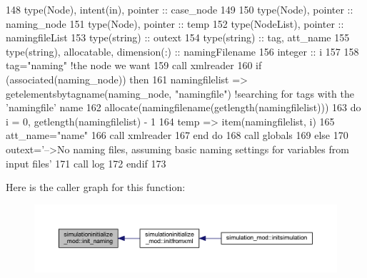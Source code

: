 \begin{DoxyCode}
148     \textcolor{keywordtype}{type}(Node), \textcolor{keywordtype}{intent(in)}, \textcolor{keywordtype}{pointer} :: case\_node
149 
150     \textcolor{keywordtype}{type}(Node), \textcolor{keywordtype}{pointer} :: naming\_node
151     \textcolor{keywordtype}{type}(Node), \textcolor{keywordtype}{pointer} :: temp
152     \textcolor{keywordtype}{type}(NodeList), \textcolor{keywordtype}{pointer} :: namingfileList
153     \textcolor{keywordtype}{type}(string) :: outext
154     \textcolor{keywordtype}{type}(string) :: tag, att\_name
155     \textcolor{keywordtype}{type}(string), \textcolor{keywordtype}{allocatable}, \textcolor{keywordtype}{dimension(:)} :: namingFilename
156     \textcolor{keywordtype}{integer} :: i
157 
158     tag=\textcolor{stringliteral}{"naming"}    \textcolor{comment}{!the node we want}
159     \textcolor{keyword}{call }xmlreader%
160     \textcolor{keywordflow}{if} (\textcolor{keyword}{associated}(naming\_node)) \textcolor{keywordflow}{then}
161         namingfilelist => getelementsbytagname(naming\_node, \textcolor{stringliteral}{"namingfile"})       \textcolor{comment}{!searching for tags with
       the 'namingfile' name}
162         \textcolor{keyword}{allocate}(namingfilename(getlength(namingfilelist)))
163         \textcolor{keywordflow}{do} i = 0, getlength(namingfilelist) - 1
164             temp => item(namingfilelist, i)
165             att\_name=\textcolor{stringliteral}{"name"}
166             \textcolor{keyword}{call }xmlreader%
167 \textcolor{keywordflow}{        end do}
168         \textcolor{keyword}{call }globals%
169     \textcolor{keywordflow}{else}
170         outext=\textcolor{stringliteral}{'-->No naming files, assuming basic naming settings for variables from input files'}
171         \textcolor{keyword}{call }log%
172 \textcolor{keywordflow}{    endif}
173 
\end{DoxyCode}
Here is the caller graph for this function\+:\nopagebreak
\begin{figure}[H]
\begin{center}
\leavevmode
\includegraphics[width=350pt]{namespacesimulationinitialize__mod_a4909cc4cb57549e6eed3f69d6dfa30b5_icgraph}
\end{center}
\end{figure}
\mbox{\label{namespacesimulationinitialize__mod_a0b32e8c950fc615198d1e47ba1d36cd6}} 
